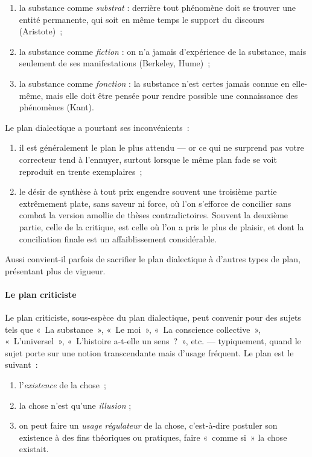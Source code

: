 \documentclass[a4paper,12pt]{article}
\begin{document}
\begin{enumerate}
\item la substance comme \emph{substrat} : derrière tout phénomène doit se
trouver une entité permanente, qui soit en même temps le support du
discours (Aristote) ;

\item la substance comme \emph{fiction} : on n'a jamais d'expérience de la
substance, mais seulement de ses manifestations (Berkeley, Hume) ;

\item la substance comme \emph{fonction} : la substance n'est certes jamais
connue en elle-même, mais elle doit être pensée pour rendre possible
une connaissance des phénomènes (Kant).
\end{enumerate}

Le plan dialectique a pourtant ses inconvénients :

\begin{enumerate}
\item il est généralement le plan le plus attendu --- or ce qui ne surprend
pas votre correcteur tend à l'ennuyer, surtout lorsque le même plan
fade se voit reproduit en trente exemplaires ;

\item le désir de synthèse à tout prix engendre souvent une troisième
partie extrêmement plate, sans saveur ni force, où l'on s'efforce de
concilier sans combat la version amollie de thèses contradictoires.
Souvent la deuxième partie, celle de la critique, est celle où l'on a
pris le plus de plaisir, et dont la conciliation finale est un
affaiblissement considérable.
\end{enumerate}

Aussi convient-il parfois de sacrifier le plan dialectique à d'autres
types de plan, présentant plus de vigueur.

\paragraph{Le plan criticiste}
\label{sec-3-1-4-3}

Le plan criticiste, sous-espèce du plan dialectique, peut convenir pour
des sujets tels que « La substance », « Le moi », « La conscience
collective », « L'universel », « L'histoire a-t-elle un sens ? », etc. ---
typiquement, quand le sujet porte sur une notion transcendante mais
d'usage fréquent. Le plan est le suivant :

\begin{enumerate}
\item l'\emph{existence} de la chose ;

\item la chose n'est qu'une \emph{illusion} ;

\item on peut faire un \emph{usage régulateur} de la chose, c'est-à-dire
postuler son existence à des fins théoriques ou pratiques, faire
« comme si » la chose existait.
\end{enumerate}
\end{document}
